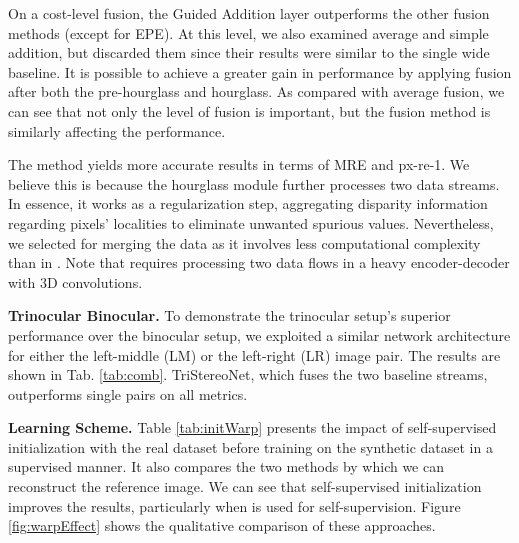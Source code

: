 \documentclass[10pt,twocolumn,letterpaper]{article}
\begin{document}
On a cost-level fusion, the Guided Addition layer outperforms the other fusion methods (except for EPE). At this level, we also examined average and simple addition, but discarded them since their results were similar to the single wide baseline. It is possible to achieve a greater gain in performance by applying fusion after both the pre-hourglass and hourglass. As compared with average fusion, we can see that not only the level of fusion is important, but the fusion method is similarly affecting the performance.

The  method yields more accurate results in terms of MRE and px-re-1. We believe this is because the hourglass module further processes two data streams. In essence, it works as a regularization step, aggregating disparity information regarding pixels' localities to eliminate unwanted spurious values. Nevertheless, we selected  for merging the data as it involves less computational complexity than in . Note that  requires processing two data flows in a heavy encoder-decoder with 3D convolutions.

\noindent\textbf{Trinocular \vs Binocular.} To demonstrate the trinocular setup's superior performance over the binocular setup, we exploited a similar network architecture for either the left-middle (LM) or the left-right (LR) image pair. The results are shown in Tab. \ref{tab:comb}. TriStereoNet, which fuses the two baseline streams, outperforms single pairs on all metrics. 

\noindent\textbf{Learning Scheme.} Table \ref{tab:initWarp} presents the impact of self-supervised initialization with the real dataset before training on the synthetic dataset in a supervised manner. It also compares the two methods by which we can reconstruct the reference image. We can see that self-supervised initialization improves the results, particularly when  is used for self-supervision. Figure \ref{fig:warpEffect} shows the qualitative comparison of these approaches.
\end{document}
